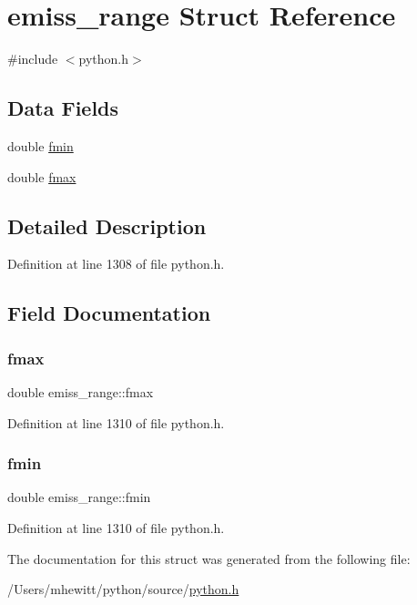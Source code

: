 \hypertarget{structemiss__range}{}\section{emiss\+\_\+range Struct Reference}
\label{structemiss__range}


{\ttfamily \#include $<$python.\+h$>$}

\subsection*{Data Fields}
\begin{DoxyCompactItemize}
\item 
double \hyperlink{structemiss__range_ae32bcc0c5aa7a7f15c63cee741f1f2b0}{fmin}
\item 
double \hyperlink{structemiss__range_ac6c5df2b3f9dd4eb3bc729feac39ae2d}{fmax}
\end{DoxyCompactItemize}


\subsection{Detailed Description}


Definition at line 1308 of file python.\+h.



\subsection{Field Documentation}
\mbox{\label{structemiss__range_ac6c5df2b3f9dd4eb3bc729feac39ae2d}} 
\subsubsection{\texorpdfstring{fmax}{fmax}}
{\footnotesize\ttfamily double emiss\+\_\+range\+::fmax}



Definition at line 1310 of file python.\+h.

\mbox{\label{structemiss__range_ae32bcc0c5aa7a7f15c63cee741f1f2b0}} 
\subsubsection{\texorpdfstring{fmin}{fmin}}
{\footnotesize\ttfamily double emiss\+\_\+range\+::fmin}



Definition at line 1310 of file python.\+h.



The documentation for this struct was generated from the following file\+:\begin{DoxyCompactItemize}
\item 
/\+Users/mhewitt/python/source/\hyperlink{python_8h}{python.\+h}\end{DoxyCompactItemize}
